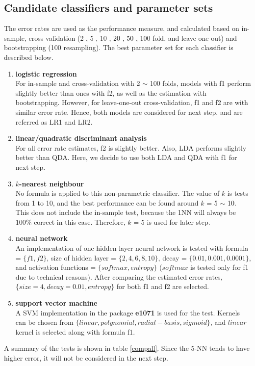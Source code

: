 \documentclass[a4paper,12pt]{article}
\begin{document}
\subsection*{\bf Candidate classifiers and parameter sets}
The error rates are used as the performance measure, and calculated based on in-sample, cross-validation (2-, 5-, 10-, 20-, 50-, 100-fold, and leave-one-out) and bootstrapping (100 resampling).  The best parameter set for each classifier is described below.

\begin{enumerate}
\item {\bf logistic regression}\\
For in-sample and cross-validation with 2 $\sim$ 100 folds, models with f1 perform slightly better than ones with f2, as well as the estimation with bootstrapping.  However, for leave-one-out cross-validation, f1 and f2 are with similar error rate.  Hence, both models are considered for next step, and are referred as LR1 and LR2.

\item {\bf linear/quadratic discriminant analysis}\\
For all error rate estimates, f2 is slightly better. Also, LDA performs slightly better than QDA.  Here, we decide to use both LDA and QDA with f1 for next step.

\item {\bf $k$-nearest neighbour}\\
No formula is applied to this non-parametric classifier.  The value of $k$ is tests from 1 to 10, and the best performance can be found around $k$ = 5 $\sim$ 10.  This does not include the in-sample test, because the 1NN will always be $100\%$ correct in this case.  Therefore, $k$ = 5 is used for later step.

\item {\bf neural network}\\
An implementation of one-hidden-layer neural network is tested with formula = $\{f1,f2\}$, size of hidden layer = $\{2,4,6,8,10\}$, decay = $\{0.01, 0.001, 0.0001\}$, and activation functions = $\{softmax, entropy\}$ ($softmax$ is tested only for f1 due to technical reasons).  After comparing the estimated error rates, $\{size = 4, decay = 0.01, entropy\}$ for both f1 and f2 are selected.

\item {\bf support vector machine}\\
A SVM implementation in the package {\bf e1071} is used for the test.  Kernels can be chosen from $\{linear, polynomial, radial-basis, sigmoid\}$, and $linear$ kernel is selected along with formula f1.

\end{enumerate}
A summary of the tests is shown in table \ref{compall}.  Since the $5$-NN tends to have higher error, it will not be considered in the next step.
\end{document}
